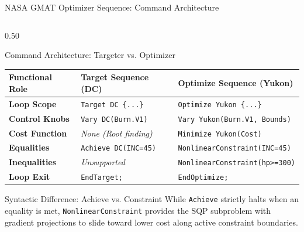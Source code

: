 \documentclass[aspectratio=169, 10pt]{beamer}
\begin{document}
\begin{frame}{NASA GMAT Optimizer Sequence: Command Architecture}
\begin{columns}[t]
        \begin{column}{0.50\textwidth}
            \begin{block}{Command Architecture: Targeter vs. Optimizer}
                \centering
                \scriptsize
                \setlength{\tabcolsep}{2pt}
                \begin{tabular}{lll}
                    \toprule
                    \textbf{Functional Role} & \textbf{Target Sequence (DC)} & \textbf{Optimize Sequence (Yukon)} \\ \midrule
                    \textbf{Loop Scope}      & \texttt{Target DC \{...\}}    & \texttt{Optimize Yukon \{...\}} \\
                    \textbf{Control Knobs}   & \texttt{Vary DC(Burn.V1)}     & \texttt{Vary Yukon(Burn.V1, Bounds)} \\
                    \textbf{Cost Function}   & \textit{None (Root finding)}  & \texttt{Minimize Yukon(Cost)} \\
                    \textbf{Equalities}      & \texttt{Achieve DC(INC=45)}   & \texttt{NonlinearConstraint(INC=45)} \\
                    \textbf{Inequalities}    & \textit{Unsupported}          & \texttt{NonlinearConstraint(hp>=300)} \\
                    \textbf{Loop Exit}       & \texttt{EndTarget;}           & \texttt{EndOptimize;} \\ \bottomrule
                \end{tabular}
            \end{block}

            \vspace{-0.08cm}

            \begin{alertblock}{Syntactic Difference: Achieve vs. Constraint}
                \scriptsize
                While \texttt{Achieve} strictly halts when an equality is met, \texttt{NonlinearConstraint} provides the SQP subproblem with gradient projections to slide toward lower cost along active constraint boundaries.
            \end{alertblock}
        \end{column}
    \end{columns}
\end{frame}
\end{document}
